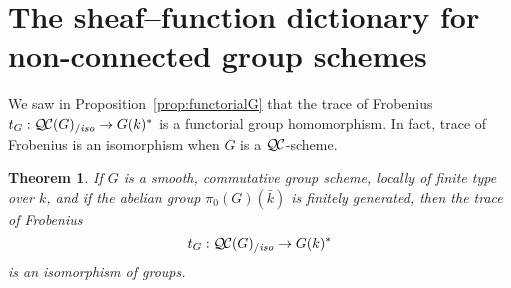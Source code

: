\documentclass[11pt]{amsart}
\theoremstyle{plain}
\newtheorem{theorem}{Theorem}[section]
\theoremstyle{definition}
\theoremstyle{remark}
\newcommand{\bFq}{\bar{k}}
\newcommand{\Fq}{k}
\newcommand{\QC}{{\mathcal{Q\hskip-0.8pt C}}}
\newcommand{\QCiso}[1]{\QC(#1)_{/\textit{iso}}}
\newcommand{\trFrob}[1]{t_{#1}}
\begin{document}
\section{The sheaf--function dictionary for non-connected group schemes}
\label{sec:snake}

We saw in Proposition~\ref{prop:functorialG} that the trace of Frobenius
$\trFrob{G} : \QCiso{G} \to G(\Fq)^*$ is a functorial group homomorphism.
In fact, trace of Frobenius is an isomorphism when $G$ is a $\QC$-scheme.

%
\begin{theorem}\label{thm:snake}
  If $G$ is a smooth, commutative group scheme, locally of finite type over
  $\Fq$, and if the abelian group $\pi_0(G)(\bFq)$
  is finitely generated, then the trace of Frobenius
  \[
  \trFrob{G} : \QCiso{G} \to G(\Fq)^*
  \]
  is an isomorphism of groups.
\end{theorem}
\end{document}
